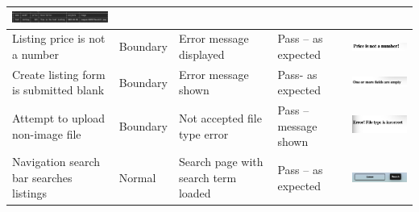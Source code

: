 \begin{center}
\begin{longtable}{|P{17mm}|P{17mm}|P{16mm}|P{17mm}|P{60mm}|}
\includegraphics[width=58mm]{ch3_developing/proto3/media/image18.png} \\ \hline
Listing price is not a number & Boundary & Error message displayed &
Pass -- as expected &
\includegraphics[width=58mm]{ch3_developing/proto3/media/image19.png} \\ \hline
Create listing form is submitted blank & Boundary & Error message shown
& Pass- as expected &
\includegraphics[width=58mm]{ch3_developing/proto3/media/image20.png} \\ \hline
Attempt to upload non-image file & Boundary & Not accepted file type
error & Pass -- message shown &
\includegraphics[width=58mm]{ch3_developing/proto3/media/image21.png} \\ \hline
Navigation search bar searches listings & Normal & Search page with
search term loaded & Pass -- as expected &
\includegraphics[width=58mm]{ch3_developing/proto3/media/image22.png}


\end{longtable}
\end{center}
